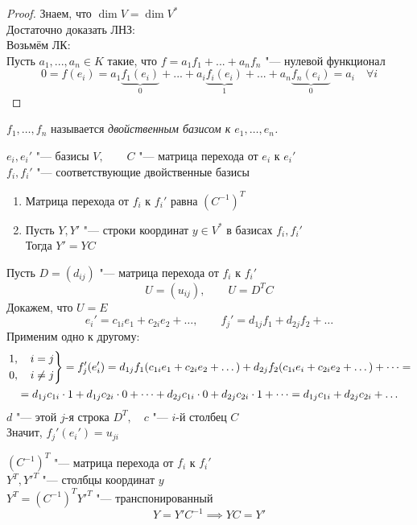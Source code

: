 \begin{proof}
	Знаем, что $ \dim V = \dim V^* $ \\
	Достаточно доказать ЛНЗ: \\
	Возьмём ЛК: \\
	Пусть $ a_1, ..., a_n \in K $ такие, что $ f = a_1f_1 + ... + a_nf_n $ "--- нулевой функционал
	$$ 0 = f(e_i) = a_1\underbrace{f_1(e_i)}_0 + ... + a_i\underbrace{f_i(e_i)}_1 + ... + a_n\underbrace{f_n(e_i)}_0 = a_i \quad \forall i $$
\end{proof}

\begin{definition}
	$ f_1, \dots, f_n $ называется \it{двойственным базисом} к $ e_1, \dots, e_n $.
\end{definition}

\begin{theorem}
	$ e_i, e_i' $ "--- базисы $ V, \qquad C $ "--- матрица перехода от $ e_i $ к $ e_i' $ \\
	$ f_i, f_i' $ "--- соответствующие двойственные базисы

	\begin{enumerate}
		\item Матрица перехода от $ f_i $ к $ f_i' $ равна $ (C^{-1})^T $

		\item Пусть $ Y, Y' $ "--- строки координат $ y \in V^* $ в базисах $ f_i, f_i' $ \\
		Тогда $ Y' = YC $
	\end{enumerate}
\end{theorem}

\begin{eproof}
	\item Пусть $ D = (d_{ij}) $ "--- матрица перехода от $ f_i $ к $ f_i' $
	$$ U = (u_{ij}), \qquad U = D^TC $$
	Докажем, что $ U = E $
	$$ e_i' = c_{1i}e_1 + c_{2i}e_2 + \dots, \qquad f_j' = d_{1j}f_1 + d_{2j}f_2 + \dots $$
	Применим одно к другому:
	\begin{multline*}
		\begin{rcases}
			1, \quad i = j \\
			0, \quad i \ne j
		\end{rcases} = f_j'(e_i') = d_{1j}f_1(c_{1i}e_1 + c_{2i}e_2 + \dots) + d_{2j}f_2(c_{1i}e_i + c_{2i}e_2 + \dots) + \dots = \\
		= d_{1j}c_{1i} \cdot 1 + d_{1j}c_{2i} \cdot 0 + \dots + d_{2j}c_{1i} \cdot 0 + d_{2j}c_{2i} \cdot 1 + \dots = d_{1j}c_{1i} + d_{2j}c_{2i} + \dots
	\end{multline*}
	$ d $ "--- этой $ j $-я строка $ D^T, \quad c $ "--- $ i $-й столбец $ C $ \\
	Значит, $ f_j'(e_i') = u_{ji} $

	\item $ (C^{-1})^T $ "--- матрица перехода от $ f_i $ к $ f_i' $ \\
	$ Y^T, Y'^T $ "--- столбцы координат $ y $ \\
	$ Y^T = (C^{-1})^TY'^T $ "--- транспонированный
	$$ Y = Y'C^{-1} \implies YC = Y' $$
\end{eproof}

